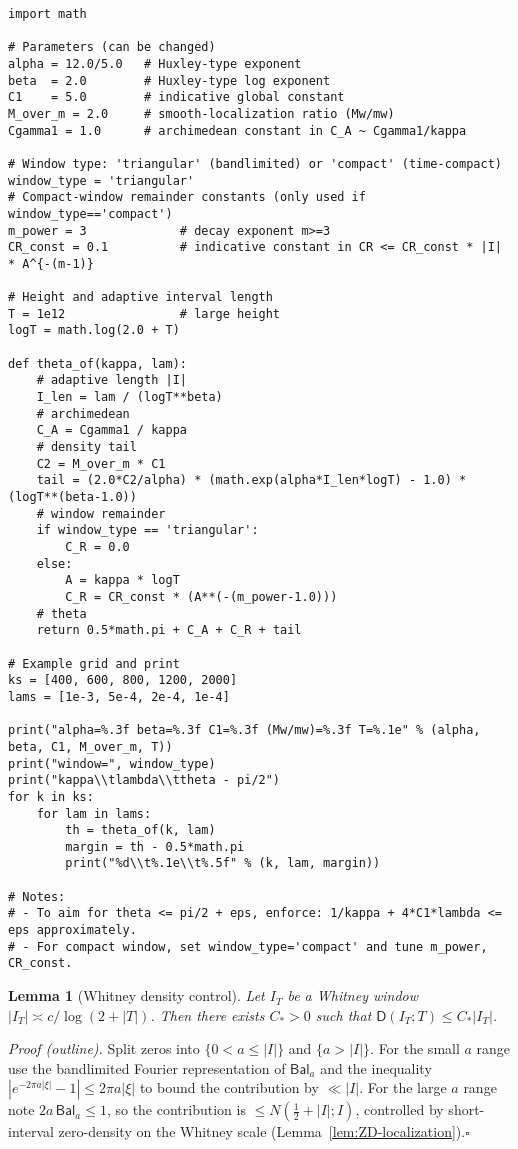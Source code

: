 \documentclass[11pt]{article}
\newtheorem{lemma}[theorem]{Lemma}
\theoremstyle{remark}
\begin{document}
\begin{verbatim}
import math

# Parameters (can be changed)
alpha = 12.0/5.0   # Huxley-type exponent
beta  = 2.0        # Huxley-type log exponent
C1    = 5.0        # indicative global constant
M_over_m = 2.0     # smooth-localization ratio (Mw/mw)
Cgamma1 = 1.0      # archimedean constant in C_A ~ Cgamma1/kappa

# Window type: 'triangular' (bandlimited) or 'compact' (time-compact)
window_type = 'triangular'
# Compact-window remainder constants (only used if window_type=='compact')
m_power = 3             # decay exponent m>=3
CR_const = 0.1          # indicative constant in CR <= CR_const * |I| * A^{-(m-1)}

# Height and adaptive interval length
T = 1e12                # large height
logT = math.log(2.0 + T)

def theta_of(kappa, lam):
    # adaptive length |I|
    I_len = lam / (logT**beta)
    # archimedean
    C_A = Cgamma1 / kappa
    # density tail
    C2 = M_over_m * C1
    tail = (2.0*C2/alpha) * (math.exp(alpha*I_len*logT) - 1.0) * (logT**(beta-1.0))
    # window remainder
    if window_type == 'triangular':
        C_R = 0.0
    else:
        A = kappa * logT
        C_R = CR_const * (A**(-(m_power-1.0)))
    # theta
    return 0.5*math.pi + C_A + C_R + tail

# Example grid and print
ks = [400, 600, 800, 1200, 2000]
lams = [1e-3, 5e-4, 2e-4, 1e-4]

print("alpha=%.3f beta=%.3f C1=%.3f (Mw/mw)=%.3f T=%.1e" % (alpha, beta, C1, M_over_m, T))
print("window=", window_type)
print("kappa\\tlambda\\ttheta - pi/2")
for k in ks:
    for lam in lams:
        th = theta_of(k, lam)
        margin = th - 0.5*math.pi
        print("%d\\t%.1e\\t%.5f" % (k, lam, margin))

# Notes:
# - To aim for theta <= pi/2 + eps, enforce: 1/kappa + 4*C1*lambda <= eps approximately.
# - For compact window, set window_type='compact' and tune m_power, CR_const.
\end{verbatim}

\begin{lemma}[Whitney density control]\label{lem:whitney-density}
Let \(I_T\) be a Whitney window \(|I_T|\asymp c/\log(2+|T|)\). Then there exists \(C_{\!*}>0\) such that \(\mathsf D(I_T;T)\le C_{\!*}|I_T|\).
\end{lemma}
\noindent\emph{Proof (outline).} Split zeros into \(\{0<a\le |I|\}\) and \(\{a>|I|\}\). For the small \(a\) range use the bandlimited Fourier representation of \(\mathsf{Bal}_a\) and the inequality \(|e^{-2\pi a|\xi|}-1|\le 2\pi a|\xi|\) to bound the contribution by \(\ll |I|\). For the large \(a\) range note \(2a\,\mathsf{Bal}_a\le 1\), so the contribution is \(\le N(\tfrac12+|I|;I)\), controlled by short-interval zero-density on the Whitney scale (Lemma~\ref{lem:ZD-localization}).\hfill$\square$
\end{document}

